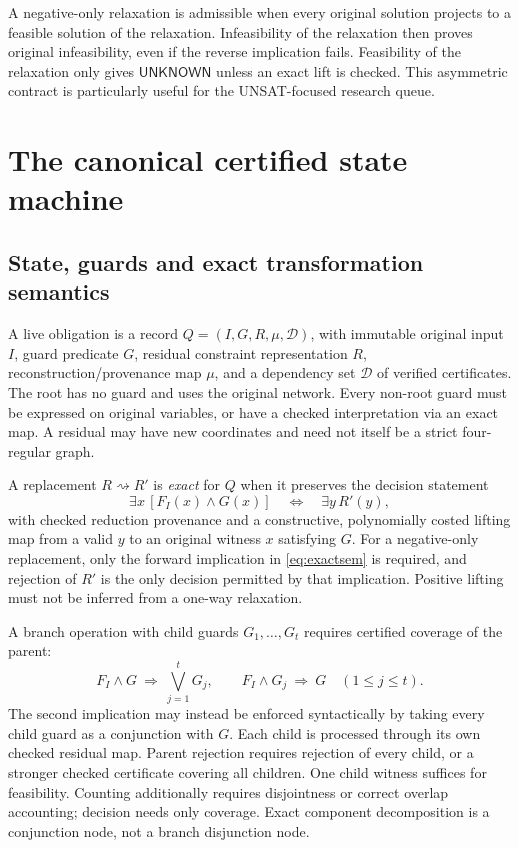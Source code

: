 \documentclass[11pt,letterpaper]{article}
\theoremstyle{definition}
\newcommand{\UNK}{\ensuremath{\mathsf{UNKNOWN}}}
\begin{document}
A negative-only relaxation is admissible when every original solution projects to a feasible solution of the relaxation. Infeasibility of the relaxation then proves original infeasibility, even if the reverse implication fails. Feasibility of the relaxation only gives \(\UNK\) unless an exact lift is checked. This asymmetric contract is particularly useful for the UNSAT-focused research queue.

\section{The canonical certified state machine}\label{sec:canonical}
\subsection{State, guards and exact transformation semantics}
A live obligation is a record \(Q=(I,G,R,\mu,\mathcal D)\), with immutable original input \(I\), guard predicate \(G\), residual constraint representation \(R\), reconstruction/provenance map \(\mu\), and a dependency set \(\mathcal D\) of verified certificates. The root has no guard and uses the original network. Every non-root guard must be expressed on original variables, or have a checked interpretation via an exact map. A residual may have new coordinates and need not itself be a strict four-regular graph.

A replacement \(R\rightsquigarrow R'\) is \emph{exact} for \(Q\) when it preserves the decision statement
\begin{equation}\label{eq:exactsem}
 \exists x\,[F_I(x)\land G(x)]\quad\Longleftrightarrow\quad\exists y\,R'(y),
\end{equation}
with checked reduction provenance and a constructive, polynomially costed lifting map from a valid \(y\) to an original witness \(x\) satisfying \(G\). For a negative-only replacement, only the forward implication in \eqref{eq:exactsem} is required, and rejection of \(R'\) is the only decision permitted by that implication. Positive lifting must not be inferred from a one-way relaxation.

A branch operation with child guards \(G_1,\ldots,G_t\) requires certified coverage of the parent:
\[
 F_I\land G\ \Rightarrow\ \bigvee_{j=1}^t G_j,
 \qquad F_I\land G_j\ \Rightarrow\ G\quad(1\le j\le t).
\]
The second implication may instead be enforced syntactically by taking every child guard as a conjunction with \(G\). Each child is processed through its own checked residual map. Parent rejection requires rejection of every child, or a stronger checked certificate covering all children. One child witness suffices for feasibility. Counting additionally requires disjointness or correct overlap accounting; decision needs only coverage. Exact component decomposition is a conjunction node, not a branch disjunction node.
\end{document}
